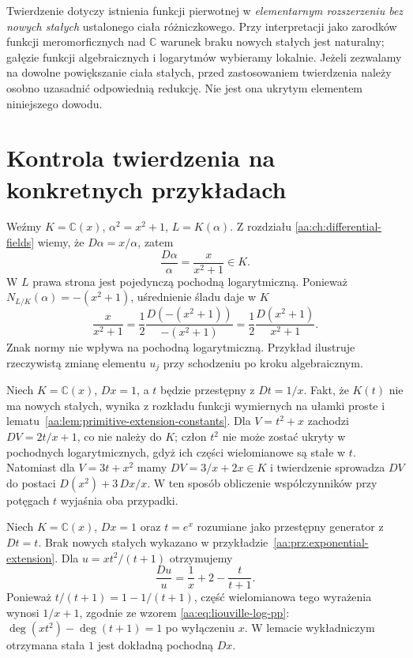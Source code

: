 \begin{uwaga}
\label{aa:uw:liouville-scope}
Twierdzenie dotyczy istnienia funkcji pierwotnej
w \emph{elementarnym rozszerzeniu bez nowych stałych}
ustalonego ciała różniczkowego. Przy interpretacji
jako zarodków funkcji meromorficznych nad
$\mathbb C$ warunek braku nowych stałych jest
naturalny; gałęzie funkcji algebraicznych i
logarytmów wybieramy lokalnie. Jeżeli zezwalamy
na dowolne powiększanie ciała stałych, przed
zastosowaniem twierdzenia należy osobno uzasadnić
odpowiednią redukcję. Nie jest ona ukrytym
elementem niniejszego dowodu.
\end{uwaga}

\section{Kontrola twierdzenia na konkretnych przykładach}

\begin{przyklad}
\label{aa:prz:liouville-norm-sqrt}
Weźmy $K=\mathbb C(x)$, $\alpha^2=x^2+1$,
$L=K(\alpha)$. Z rozdziału
\ref{aa:ch:differential-fields} wiemy, że
$D\alpha=x/\alpha$, zatem
\[
 \frac{D\alpha}{\alpha}
 =\frac{x}{x^2+1}\in K.
\]
W $L$ prawa strona jest pojedynczą
pochodną logarytmiczną.
Ponieważ $N_{L/K}(\alpha)=-(x^2+1)$,
uśrednienie śladu daje w $K$
\[
 \frac{x}{x^2+1}
 =\frac12\frac{D(-(x^2+1))}{-(x^2+1)}
 =\frac12\frac{D(x^2+1)}{x^2+1}.
\]
Znak normy nie wpływa na pochodną logarytmiczną.
Przykład ilustruje rzeczywistą zmianę elementu
$u_j$ przy schodzeniu po kroku algebraicznym.
\end{przyklad}

\begin{przyklad}
\label{aa:prz:liouville-log-step}
Niech $K=\mathbb C(x)$, $Dx=1$, a $t$ będzie
przestępny z $Dt=1/x$.
Fakt, że $K(t)$ nie ma nowych stałych, wynika
z rozkładu funkcji wymiernych na ułamki proste
i lematu~\ref{aa:lem:primitive-extension-constants}.
Dla $V=t^2+x$ zachodzi $DV=2t/x+1$,
co nie należy do $K$; człon $t^2$ nie może
zostać ukryty w pochodnych logarytmicznych,
gdyż ich części wielomianowe są stałe w $t$.
Natomiast dla $V=3t+x^2$
mamy $DV=3/x+2x\in K$ i twierdzenie
sprowadza $DV$ do postaci
$D(x^2)+3\,Dx/x$.
W ten sposób obliczenie współczynników
przy potęgach $t$ wyjaśnia oba przypadki.
\end{przyklad}

\begin{przyklad}
\label{aa:prz:liouville-exp-step}
Niech $K=\mathbb C(x)$, $Dx=1$ oraz
$t=e^x$ rozumiane jako przestępny generator
z $Dt=t$. Brak nowych stałych wykazano
w przykładzie~\ref{aa:prz:exponential-extension}.
Dla $u=xt^2/(t+1)$ otrzymujemy
\[
 \frac{Du}{u}=\frac1x+2-\frac{t}{t+1}.
\]
Ponieważ $t/(t+1)=1-1/(t+1)$,
część wielomianowa tego wyrażenia wynosi
$1/x+1$, zgodnie ze wzorem
\eqref{aa:eq:liouville-log-pp}:
$\deg(xt^2)-\deg(t+1)=1$ po wyłączeniu $x$.
W lemacie wykładniczym otrzymana
stała $1$ jest dokładną pochodną $Dx$.
\end{przyklad}

